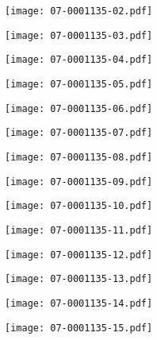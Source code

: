 \documentclass[10pt,twocolumn,letterpaper]{article}
\begin{document}
\begin{figure*}[t]
 \begin{minipage}{0.058\textwidth} \centering \texttt{[image: 07-0001135-02.pdf]} \end{minipage}
 \begin{minipage}{0.058\textwidth} \centering \texttt{[image: 07-0001135-03.pdf]} \end{minipage}
 \begin{minipage}{0.058\textwidth} \centering \texttt{[image: 07-0001135-04.pdf]} \end{minipage}
 \begin{minipage}{0.058\textwidth} \centering \texttt{[image: 07-0001135-05.pdf]} \end{minipage}
 \begin{minipage}{0.058\textwidth} \centering \texttt{[image: 07-0001135-06.pdf]} \end{minipage}
 \begin{minipage}{0.058\textwidth} \centering \texttt{[image: 07-0001135-07.pdf]} \end{minipage}
 \begin{minipage}{0.058\textwidth} \centering \texttt{[image: 07-0001135-08.pdf]} \end{minipage}
 \begin{minipage}{0.058\textwidth} \centering \texttt{[image: 07-0001135-09.pdf]} \end{minipage}
 \begin{minipage}{0.058\textwidth} \centering \texttt{[image: 07-0001135-10.pdf]} \end{minipage}
 \begin{minipage}{0.058\textwidth} \centering \texttt{[image: 07-0001135-11.pdf]} \end{minipage}
 \begin{minipage}{0.058\textwidth} \centering \texttt{[image: 07-0001135-12.pdf]} \end{minipage}
 \begin{minipage}{0.058\textwidth} \centering \texttt{[image: 07-0001135-13.pdf]} \end{minipage}
 \begin{minipage}{0.058\textwidth} \centering \texttt{[image: 07-0001135-14.pdf]} \end{minipage}
 \begin{minipage}{0.058\textwidth} \centering \texttt{[image: 07-0001135-15.pdf]} \end{minipage}

\end{figure*}
\end{document}
